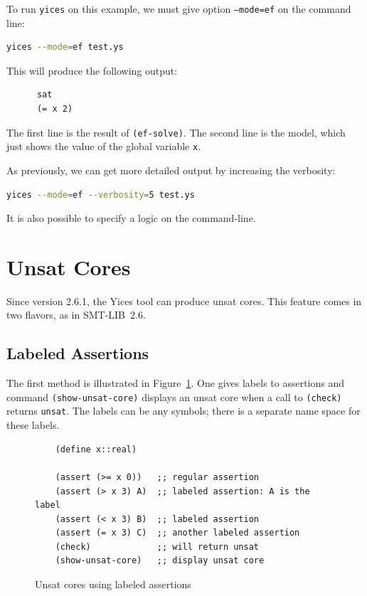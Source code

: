 \documentclass[11pt,twoside,fleqn,openright,titlepage]{cslreport}
\begin{document}
\medskip\noindent
To run \texttt{yices} on this example, we must give option
\texttt{--mode=ef} on the command line:
\begin{small}
\begin{lstlisting}[language=sh,deletekeywords={test}]
   yices --mode=ef test.ys
\end{lstlisting}
\end{small}
This will produce the following output:
\begin{small}
\begin{verbatim}
      sat
      (= x 2)
\end{verbatim}
\end{small}
The first line is the result of \texttt{(ef-solve)}. The second line
is the model, which just shows the value of the global variable
\texttt{x}.

\medskip\noindent
As previously, we can get more detailed output by increasing the verbosity:
\begin{small}
\begin{lstlisting}[language=sh]
   yices --mode=ef --verbosity=5 test.ys
\end{lstlisting}
\end{small}
It is also possible to specify a logic on the command-line.

\section{Unsat Cores}

Since version 2.6.1, the Yices tool can produce unsat cores. This
feature comes in two flavors, as in SMT-LIB~2.6.

\subsection{Labeled Assertions}

The first method is illustrated in
Figure~\ref{example:labeled-assertions}. One gives labels to assertions and
command \texttt{(show-unsat-core)} displays an unsat core when a call
to \texttt{(check)} returns \texttt{unsat}.  The labels can be any
symbols; there is a separate name space for these labels.

\begin{figure}[h]
\begin{footnotesize}
\begin{verbatim}
    (define x::real)

    (assert (>= x 0))   ;; regular assertion
    (assert (> x 3) A)  ;; labeled assertion: A is the label
    (assert (< x 3) B)  ;; labeled assertion
    (assert (= x 3) C)  ;; another labeled assertion
    (check)             ;; will return unsat
    (show-unsat-core)   ;; display unsat core
\end{verbatim}
\end{footnotesize}
\caption{Unsat cores using labeled assertions}
\label{example:labeled-assertions}
\end{figure}
\end{document}
